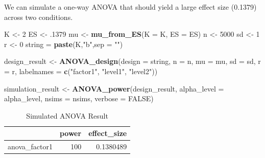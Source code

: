 \documentclass[]{book}
\newenvironment{Shaded}{\begin{snugshade}}{\end{snugshade}}
\newcommand{\DataTypeTok}[1]{\textcolor[rgb]{0.13,0.29,0.53}{#1}}
\newcommand{\DecValTok}[1]{\textcolor[rgb]{0.00,0.00,0.81}{#1}}
\newcommand{\FloatTok}[1]{\textcolor[rgb]{0.00,0.00,0.81}{#1}}
\newcommand{\KeywordTok}[1]{\textcolor[rgb]{0.13,0.29,0.53}{\textbf{#1}}}
\newcommand{\NormalTok}[1]{#1}
\newcommand{\OtherTok}[1]{\textcolor[rgb]{0.56,0.35,0.01}{#1}}
\newcommand{\StringTok}[1]{\textcolor[rgb]{0.31,0.60,0.02}{#1}}
\begin{document}
We can simulate a one-way ANOVA that should yield a large effect size (0.1379) across two conditions.

\begin{Shaded}
\begin{Highlighting}[]
\NormalTok{K <-}\StringTok{ }\DecValTok{2}
\NormalTok{ES <-}\StringTok{ }\FloatTok{.1379}
\NormalTok{mu <-}\StringTok{ }\KeywordTok{mu_from_ES}\NormalTok{(}\DataTypeTok{K =}\NormalTok{ K, }\DataTypeTok{ES =}\NormalTok{ ES)}
\NormalTok{n <-}\StringTok{ }\DecValTok{5000}
\NormalTok{sd <-}\StringTok{ }\DecValTok{1}
\NormalTok{r <-}\StringTok{ }\DecValTok{0}
\NormalTok{string =}\StringTok{ }\KeywordTok{paste}\NormalTok{(K,}\StringTok{"b"}\NormalTok{,}\DataTypeTok{sep =} \StringTok{""}\NormalTok{)}
\end{Highlighting}
\end{Shaded}

\begin{Shaded}
\begin{Highlighting}[]
\NormalTok{design_result <-}\StringTok{ }\KeywordTok{ANOVA_design}\NormalTok{(}\DataTypeTok{design =}\NormalTok{ string,}
                   \DataTypeTok{n =}\NormalTok{ n, }
                   \DataTypeTok{mu =}\NormalTok{ mu, }
                   \DataTypeTok{sd =}\NormalTok{ sd, }
                   \DataTypeTok{r =}\NormalTok{ r, }
                   \DataTypeTok{labelnames =} \KeywordTok{c}\NormalTok{(}\StringTok{"factor1"}\NormalTok{, }\StringTok{"level1"}\NormalTok{, }\StringTok{"level2"}\NormalTok{))}
\end{Highlighting}
\end{Shaded}

\begin{Shaded}
\begin{Highlighting}[]
\NormalTok{simulation_result <-}\StringTok{ }\KeywordTok{ANOVA_power}\NormalTok{(design_result, }
                                 \DataTypeTok{alpha_level =}\NormalTok{ alpha_level, }
                                 \DataTypeTok{nsims =}\NormalTok{ nsims,}
                                 \DataTypeTok{verbose =} \OtherTok{FALSE}\NormalTok{)}
\end{Highlighting}
\end{Shaded}

\begin{table}[!h]

\caption{\label{tab:unnamed-chunk-92}Simulated ANOVA Result}
\centering
\begin{tabular}{l|r|r}
\hline
  & power & effect\_size\\
\hline
anova\_factor1 & 100 & 0.1380489\\
\hline
\end{tabular}
\end{table}
\end{document}
